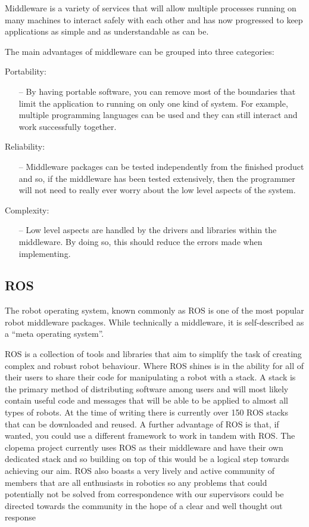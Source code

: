 \documentclass{l3proj}
\begin{document}
Middleware is a variety of services that will allow multiple processes running on many machines to interact safely with each other and has now progressed to keep applications as simple and as understandable as can be.

The main advantages of \gls{middleware} can be grouped into three categories\cite{middleware}:

Portability:
\begin{itemize}
\item[--]By having portable software, you can remove most of the boundaries that limit the application to running on only one kind of system. For example, multiple programming languages can be used and they can still interact and work successfully together.
\end{itemize}

Reliability: 
\begin{itemize}
\item[--]Middleware packages can be tested independently from the finished product and so, if the middleware has been tested extensively, then the programmer will not need to really ever worry about the low level aspects of the system.
\end{itemize}
Complexity:
\begin{itemize}
\item[--]Low level aspects are handled by the drivers and libraries within the middleware. By doing so, this should reduce the errors made when implementing.
\end{itemize}


\subsection{ROS}
The robot operating system, known commonly as ROS is one of the most popular robot middleware packages. While technically a middleware, it is self-described as a “meta operating system”\cite{ros-desc}.

ROS is a collection of tools and libraries that aim to simplify the task of creating complex and robust robot behaviour.  Where ROS shines is in the ability for all of their users to share their code for manipulating a robot with a \gls{stack}. A \gls{stack} is the primary method of distributing software among users and will most likely contain useful code and messages that will be able to be applied to almost all types of robots. At the time of writing there is currently over 150 ROS stacks that can be downloaded and reused. A further advantage of ROS is that, if wanted, you could use a different framework to work in tandem with ROS. The \acrshort{clopema} project currently uses ROS as their \gls{middleware} and have their own dedicated \gls{stack} and so building on top of this would be a logical step towards achieving our aim. ROS also boasts a very lively and active community of members that are all enthusiasts in robotics so any problems that could potentially not be solved from correspondence with our supervisors could be directed towards the community in the hope of a clear and well thought out response
\end{document}
